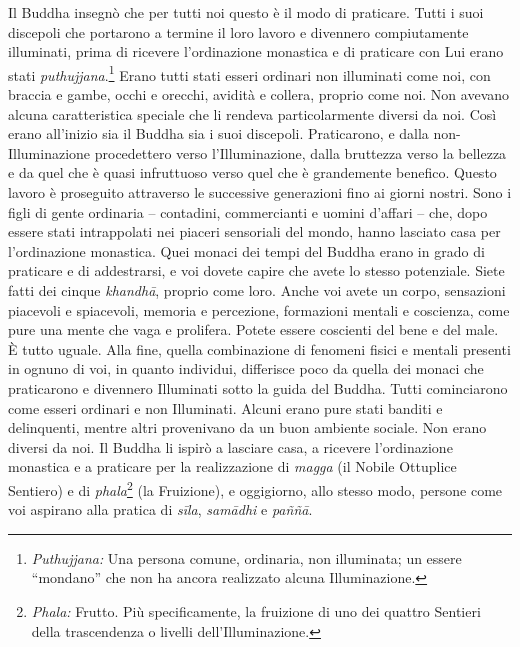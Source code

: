 Il Buddha insegnò che per tutti noi questo è il modo di praticare. Tutti
i suoi discepoli che portarono a termine il loro lavoro e divennero
compiutamente illuminati, prima di ricevere l'ordinazione monastica e di
praticare con Lui erano stati \emph{puthujjana}.\footnote{\emph{Puthujjana:}
  Una persona comune, ordinaria, non illuminata; un essere ``mondano''
  che non ha ancora realizzato alcuna Illuminazione.} Erano tutti stati
esseri ordinari non illuminati come noi, con braccia e gambe, occhi e
orecchi, avidità e collera, proprio come noi. Non avevano alcuna
caratteristica speciale che li rendeva particolarmente diversi da noi.
Così erano all'inizio sia il Buddha sia i suoi discepoli. Praticarono, e
dalla non-Illuminazione procedettero verso l'Illuminazione, dalla
bruttezza verso la bellezza e da quel che è quasi infruttuoso verso quel
che è grandemente benefico. Questo lavoro è proseguito attraverso le
successive generazioni fino ai giorni nostri. Sono i figli di gente
ordinaria -- contadini, commercianti e uomini d'affari -- che, dopo
essere stati intrappolati nei piaceri sensoriali del mondo, hanno
lasciato casa per l'ordinazione monastica. Quei monaci dei tempi del
Buddha erano in grado di praticare e di addestrarsi, e voi dovete capire
che avete lo stesso potenziale. Siete fatti dei cinque \emph{khandhā},
proprio come loro. Anche voi avete un corpo, sensazioni piacevoli e
spiacevoli, memoria e percezione, formazioni mentali e coscienza, come
pure una mente che vaga e prolifera. Potete essere coscienti del bene e
del male. È tutto uguale. Alla fine, quella combinazione di fenomeni
fisici e mentali presenti in ognuno di voi, in quanto individui,
differisce poco da quella dei monaci che praticarono e divennero
Illuminati sotto la guida del Buddha. Tutti cominciarono come esseri
ordinari e non Illuminati. Alcuni erano pure stati banditi e
delinquenti, mentre altri provenivano da un buon ambiente sociale. Non
erano diversi da noi. Il Buddha li ispirò a lasciare casa, a ricevere
l'ordinazione monastica e a praticare per la realizzazione di
\emph{magga} (il Nobile Ottuplice Sentiero) e di \emph{phala}\footnote{\emph{Phala:}
  Frutto. Più specificamente, la fruizione di uno dei quattro Sentieri
  della trascendenza o livelli dell'Illuminazione.} (la Fruizione), e
oggigiorno, allo stesso modo, persone come voi aspirano alla pratica di
\emph{sīla}, \emph{samādhi} e \emph{paññā}.

